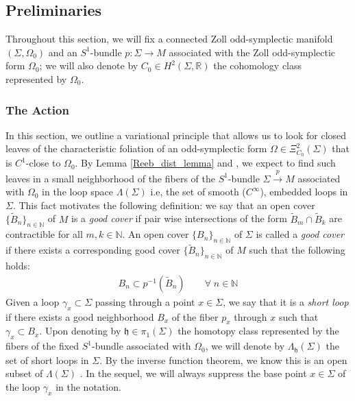 \documentclass[11pt]{amsart}
\theoremstyle{plain}
\theoremstyle{definition}
\theoremstyle{remark}
\begin{document}
\subsection{Preliminaries}\label{prelm_section}
Throughout this section, we will fix a connected Zoll odd-symplectic manifold $(\Sigma,\Omega_0)$ and an $S^1$-bundle $p: \Sigma \rightarrow M$ associated with the Zoll odd-symplectic form $\Omega_0$; we will also denote by $C_0 \in H^2(\Sigma,\mathbb{R})$ the cohomology class represented by $\Omega_0$.
\subsubsection{The Action}\label{action_section}
In this section, we outline a variational principle that allows us to look for closed leaves of the characteristic foliation of an odd-symplectic form $\Omega \in \Xi^2_{C_0}(\Sigma)$ that is $C^1$-close to $\Omega_0$. By Lemma \ref{Reeb_dist_lemma} and \cite[Proposition B.2]{Abbondandolo-Benedetti}, we expect to find such leaves in a small neighborhood of the fibers of the $S^1$-bundle $\Sigma \xrightarrow{p} M$ associated with $\Omega_0$ in the loop space $\Lambda(\Sigma)$ i.e, the set of smooth ($C^{\infty}$), embedded loops in $\Sigma$. This fact motivates the following definition: we say that an open cover $\{\tilde B_n\}_{n \in \mathbb{N}}$ of $M$ is a \emph{good cover} if pair wise intersections of the form $\tilde B_m \cap \tilde B_k$ are contractible for all $m,k \in \mathbb{N}$. An open cover $\{B_n\}_{n \in \mathbb{N}}$ of $\Sigma$ is called a \emph{good cover} if there exists a corresponding good cover $\{\tilde B_n\}_{n \in \mathbb{N}}$ of $M$ such that the following holds:
\begin{align}
    B_n \subset p^{-1}(\tilde B_n) \qquad \forall\; n\in \mathbb{N}
\end{align}
Given a loop $\gamma_x \subset \Sigma$ passing through a point $x \in \Sigma$, we say that it is a \emph{short loop} if there exists a good neighborhood $B_x$ of the fiber $p_x$ through $x$ such that $\gamma_x \subset B_x$. Upon denoting by $\mathfrak{h} \in \pi_1(\Sigma)$ the homotopy class represented by the fibers of the fixed $S^1$-bundle associated with $\Omega_0$, we will denote by $\Lambda_{\mathfrak{h}}(\Sigma)$ the set of short loops in $\Sigma$. By the inverse function theorem, we know this is an open subset of $\Lambda(\Sigma)$ \cite{Ginzburg-Kerman}. In the sequel, we will always suppress the base point $x \in \Sigma$ of the loop $\gamma_x$ in the notation.\\
\end{document}
